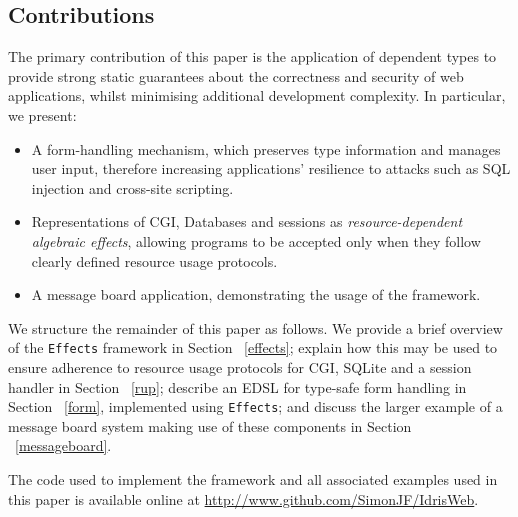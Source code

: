 \subsection{Contributions}
The primary contribution of this paper is the application of 
dependent types to provide strong static guarantees
about the correctness and security of web applications, whilst minimising
additional development complexity. In particular, we present:

\begin{itemize}
\item A form-handling mechanism, which preserves type information and
manages user input, therefore
increasing applications' resilience to attacks such as SQL injection and cross-site scripting.

\item Representations of CGI, Databases and sessions as
\textit{resource-dependent algebraic effects}, allowing programs to be accepted only when they
follow clearly defined resource usage protocols.

\item A message board application, demonstrating the usage of the framework.

\end{itemize}

We structure the remainder of this paper as follows. We provide a brief
overview of the \texttt{Effects} framework in Section ~\ref{effects}; explain
how this may be used to ensure adherence to resource usage protocols for CGI,
SQLite and a session handler in Section ~\ref{rup}; describe an EDSL for
type-safe form handling in Section ~\ref{form}, implemented using
\texttt{Effects}; and discuss the larger example
of a message board system making use of these components in Section
~\ref{messageboard}.

The code used to implement the framework and all associated examples used in this paper is available online at \url{http://www.github.com/SimonJF/IdrisWeb}.

